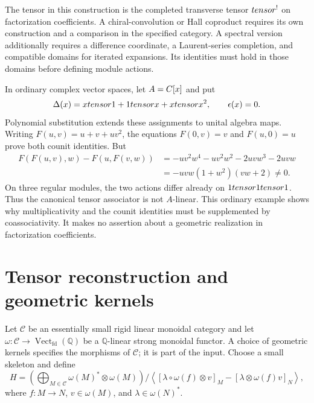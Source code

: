 The tensor in this construction is the completed transverse tensor
$tensor^!$ on factorization coefficients.
A chiral-convolution or Hall coproduct requires its own construction
and a comparison in the specified category.
A spectral version additionally requires a difference coordinate,
a Laurent-series completion, and compatible domains for iterated expansions.
Its identities must hold in those domains before defining module actions.

\begin{example}
In ordinary complex vector spaces, let $A=C[x]$ and put
\[
 \Delta(x)=xtensor1+1tensor x+xtensor x^2,
 \qquad \epsilon(x)=0.
\]
Polynomial substitution extends these assignments to unital algebra maps.
Writing $F(u,v)=u+v+uv^2$, the equations
$F(0,v)=v$ and $F(u,0)=u$ prove both counit identities.
But
\[
\begin{split}
 F(F(u,v),w)-F(u,F(v,w))
 &=-uv^2w^4-uv^2w^2-2uvw^3-2uvw\\
 &=-uvw(1+w^2)(vw+2)\ne0.
\end{split}
\]
On three regular modules, the two actions differ already on
$1tensor1tensor1$.
Thus the canonical tensor associator is not $A$-linear.
This ordinary example shows why multiplicativity and the counit identities
must be supplemented by coassociativity.
It makes no assertion about a geometric realization in factorization coefficients.
\end{example}

\section{Tensor reconstruction and geometric kernels}
Let $\mathscr C$ be an essentially small rigid linear monoidal category
and let $\omega:\mathscr C\to\operatorname{Vect}_{\mathrm{fd}}(\mathbb Q)$
be a $\mathbb Q$-linear strong monoidal functor.
A choice of geometric kernels specifies the morphisms of $\mathscr C$;
it is part of the input.
Choose a small skeleton and define
\[
 H=\left(\bigoplus_{M\in\mathscr C}\omega(M)^*\otimes\omega(M)\right)
 \big/\left\langle
 [\lambda\circ\omega(f)\otimes v]_M
 -[\lambda\otimes\omega(f)v]_N\right\rangle,
\]
where $f:M\to N$, $v\in\omega(M)$, and $\lambda\in\omega(N)^*$.


